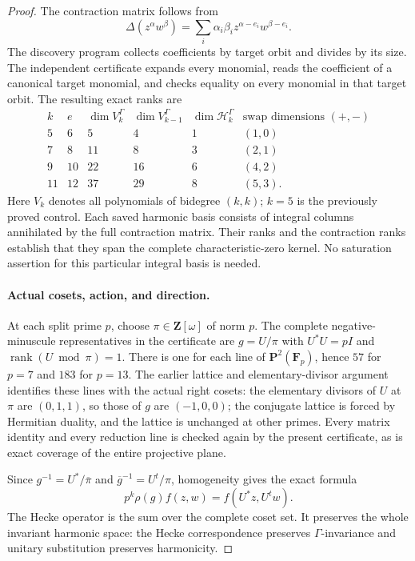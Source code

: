 \begin{proof}
The contraction matrix follows from
\[
 \Delta(z^\alpha w^\beta)
 =\sum_i\alpha_i\beta_i z^{\alpha-e_i}w^{\beta-e_i}.
\]
The discovery program collects coefficients by target orbit and
divides by its size. The independent certificate expands every
monomial, reads the coefficient of a canonical target monomial,
and checks equality on every monomial in that target orbit.
The resulting exact ranks are
\[
\begin{array}{c|c|r|r|r|c}
k&e&\dim V_k^\Gamma&\dim V_{k-1}^\Gamma&
 \dim\mathcal H_k^\Gamma&\text{swap dimensions }(+,-)\\ \hline
5&6&5&4&1&(1,0)\\
7&8&11&8&3&(2,1)\\
9&10&22&16&6&(4,2)\\
11&12&37&29&8&(5,3).
\end{array}
\tag{UG.6}
\]
Here $V_k$ denotes all polynomials of bidegree $(k,k)$; $k=5$ is the
previously proved control. Each saved harmonic basis consists of
integral columns annihilated by the full contraction matrix.
Their ranks and the contraction ranks establish that they span
the complete characteristic-zero kernel. No saturation assertion
for this particular integral basis is needed.

\paragraph{Actual cosets, action, and direction.}
At each split prime $p$, choose $\pi\in\mathbf Z[\omega]$ of norm $p$.
The complete negative-minuscule representatives in the certificate
are $g=U/\pi$ with
$U^*U=pI$ and $\operatorname{rank}(U\bmod\pi)=1$.
There is one for each line of $\mathbf P^2(\mathbf F_p)$, hence
$57$ for $p=7$ and $183$ for $p=13$.
The earlier lattice and elementary-divisor argument identifies
these lines with the actual right cosets: the elementary divisors
of $U$ at $\pi$ are $(0,1,1)$, so those of $g$ are $(-1,0,0)$;
the conjugate lattice is forced by Hermitian duality, and the
lattice is unchanged at other primes. Every matrix identity and
every reduction line is checked again by the present certificate,
as is exact coverage of the entire projective plane.

Since $g^{-1}=U^*/\overline\pi$ and
$\overline g^{-1}=U^t/\pi$, homogeneity gives the exact formula
\[
 p^k\rho(g)f(z,w)=f(U^*z,U^tw).
 \tag{UG.7}
\]
The Hecke operator is the sum over the complete coset set. It
preserves the whole invariant harmonic space: the Hecke
correspondence preserves $\Gamma$-invariance and unitary
substitution preserves harmonicity.


\end{proof}
